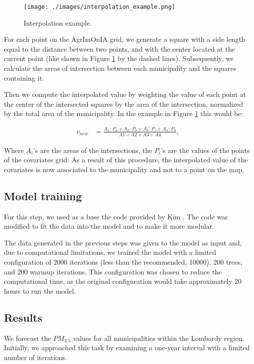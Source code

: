 \documentclass[11pt,a4paper]{article}
\begin{document}
\begin{figure}[H]
    \centering
    \texttt{[image: ./images/interpolation\_example.png]}
    \captionsetup{font=small}
    \caption{Interpolation example.}
    \label{fig:interp_ex}
\end{figure}


For each point on the AgrImOnIA grid, we generate a square with a side length equal to the distance between two points, and with the center located at the current point (like shown in Figure \ref{fig:interp_ex} by the dashed lines). Subsequently, we calculate the areas of intersection between each municipality and the squares containing it.

Then we compute the interpolated value by weighting the value of each point at the center of the intersected squares by the area of the intersection, normalized by the total area of the municipality. In the example in Figure \ref{fig:interp_ex} this would be:

\begin{align*}
    v_{new} & = \frac{A_1 \cdot P_a + A_2 \cdot P_b + A_3 \cdot P_c + A_4 \cdot P_d}{A1 + A2 + A3 + A4},
\end{align*}

Where $A_i$'s are the areas of the intersections, the $P_i$'s are the values of the points of the covariates grid. As a result of this procedure, the interpolated value of the covariates is now associated to the municipality and not to a point on the map.
\subsection{Model training}

For this step, we used as a base the code provided by Kim \cite{Kim_2022}. The code was modified to fit the data into the model and to make it more modular.

The data generated in the previous steps was given to the model as input and, due to computational limitations, we trained the model with a limited configuration of 2000 iterations (less than the recommended, 10000), 200 trees, and 200 warmup iterations. This configuration was chosen to reduce the computational time, as the original configuration would take approximately 20 hours to run the model.

\subsection{Results}
\label{sec:Results}
We forecast the $PM_{2.5}$ values for all municipalities within the Lombardy region. Initially, we approached this task by examining a one-year interval with a limited number of iterations.
\end{document}
